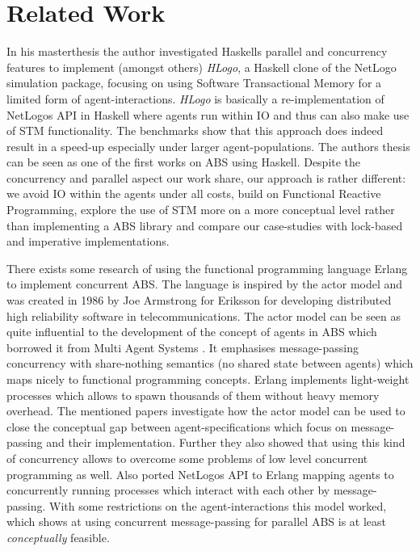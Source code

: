 \section{Related Work}
In his masterthesis \cite{bezirgiannis_improving_2013} the author investigated Haskells parallel and concurrency features to implement (amongst others) \textit{HLogo}, a Haskell clone of the NetLogo simulation package, focusing on using Software Transactional Memory for a limited form of agent-interactions. \textit{HLogo} is basically a re-implementation of NetLogos API in Haskell where agents run within IO and thus can also make use of STM functionality. The benchmarks show that this approach does indeed result in a speed-up especially under larger agent-populations. The authors thesis can be seen as one of the first works on ABS using Haskell. Despite the concurrency and parallel aspect our work share, our approach is rather different: we avoid IO within the agents under all costs, build on Functional Reactive Programming, explore the use of STM more on a more conceptual level rather than implementing a ABS library and compare our case-studies with lock-based and imperative implementations.

There exists some research \cite{di_stefano_using_2005, varela_modelling_2004, sher_agent-based_2013} of using the functional programming language Erlang \cite{armstrong_erlang_2010} to implement concurrent ABS. The language is inspired by the actor model \cite{agha_actors:_1986} and was created in 1986 by Joe Armstrong for Eriksson for developing distributed high reliability software in telecommunications. The actor model can be seen as quite influential to the development of the concept of agents in ABS which borrowed it from Multi Agent Systems \cite{wooldridge_introduction_2009}. It emphasises message-passing concurrency with share-nothing semantics (no shared state between agents) which maps nicely to functional programming concepts. Erlang implements light-weight processes which allows to spawn thousands of them without heavy memory overhead. The mentioned papers investigate how the actor model can be used to close the conceptual gap between agent-specifications which focus on message-passing and their implementation. Further they also showed that using this kind of concurrency allows to overcome some problems of low level concurrent programming as well.
Also \cite{bezirgiannis_improving_2013} ported NetLogos API to Erlang mapping agents to concurrently running processes which interact with each other by message-passing. With some restrictions on the agent-interactions this model worked, which shows at using concurrent message-passing for parallel ABS is at least \textit{conceptually} feasible.

